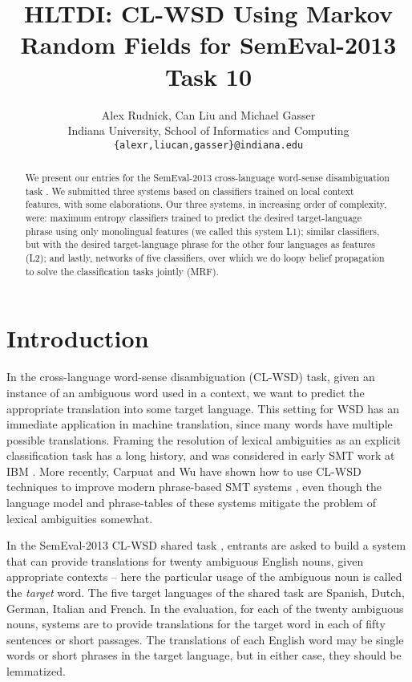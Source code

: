 \documentclass[11pt,letterpaper]{article}
\title{HLTDI: CL-WSD Using Markov Random Fields for SemEval-2013 Task 10}
\author{Alex Rudnick, Can Liu and Michael Gasser\\
	    Indiana University, School of Informatics and Computing \\
	    {\tt \{alexr,liucan,gasser\}@indiana.edu}}
\date{}
\begin{document}
\maketitle

\begin{abstract}
We present our entries for the SemEval-2013 cross-language word-sense
disambiguation task \cite{task10}. We submitted three systems based on
classifiers trained on local context features, with some elaborations. Our
three systems, in increasing order of complexity, were: maximum entropy
classifiers trained to predict the desired target-language phrase using only
monolingual features (we called this system L1); similar classifiers,
but with the desired target-language phrase for the other four languages as
features (L2); and lastly, networks of five classifiers, over which we
do loopy belief propagation to solve the classification tasks jointly
(MRF).
\end{abstract}

\section{Introduction}
In the cross-language word-sense disambiguation (CL-WSD) task, given an
instance of an ambiguous word used in a context, we want to predict the
appropriate translation into some target language. This setting for WSD has an
immediate application in machine translation, since many words have multiple
possible translations. Framing the resolution of lexical ambiguities as an
explicit classification task has a long history, and was considered in early
SMT work at IBM \cite{Brown91word-sensedisambiguation}. More recently, Carpuat
and Wu have shown how to use CL-WSD techniques to improve modern phrase-based
SMT systems \cite{carpuatpsd}, even though the language model and phrase-tables
of these systems mitigate the problem of lexical ambiguities somewhat.

In the SemEval-2013 CL-WSD shared task \cite{task10}, entrants are asked to
build a system that can provide translations for twenty ambiguous English
nouns, given appropriate contexts -- here the particular usage of the ambiguous
noun is called the \emph{target} word. The five target languages of the shared
task are Spanish, Dutch, German, Italian and French. In the evaluation, for
each of the twenty ambiguous nouns, systems are to provide translations for
the target word in each of fifty sentences or short passages. The translations
of each English word may be single words or short phrases in the target
language, but in either case, they should be lemmatized.
\end{document}
